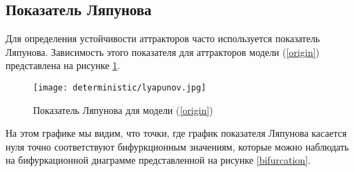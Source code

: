 \subsection{Показатель Ляпунова}    

    Для определения устойчивости аттракторов часто используется показатель Ляпунова. Зависимость этого показателя для аттракторов модели (\ref{origin}) представлена на рисунке \ref{lyapunov}. 

    \begin{figure}
        \centering
        \texttt{[image: deterministic/lyapunov.jpg]}

        \captionsetup{justification=centering}
        \caption{Показатель Ляпунова для модели (\ref{origin})}
        \label{lyapunov}
    \end{figure}

    На этом графике мы видим, что точки, где график показателя Ляпунова касается нуля точно соответствуют бифуркционным значениям, которые можно наблюдать на бифуркационной диаграмме представленной на рисунке \ref{bifurcation}.